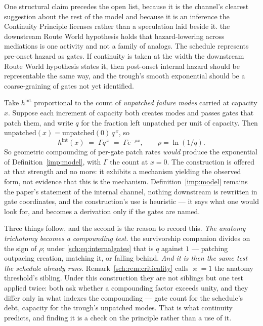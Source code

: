 One structural claim precedes the open list, because it is
the channel's clearest suggestion about the rest of the model and because
it is an inference the Continuity Principle licenses rather than a
speculation laid beside it. the downstream Route World hypothesis holds that hazard-lowering across
mediations is one activity and not a family of analogs. The schedule
represents pre-onset hazard as gates. If continuity is taken at the width
the downstream Route World hypothesis states it, then post-onset internal
hazard should be representable the same way, and the trough's smooth
exponential should be a coarse-graining of gates not yet identified.

\begin{remark}\label{sch:rem:internalgates}
Take $h^{\mathrm{int}}$ proportional to the count of \emph{unpatched
failure modes} carried at capacity $x$. Suppose each increment of
capacity both creates modes and passes gates that patch them, and write
$q$ for the fraction left unpatched per unit of capacity. Then
$\text{unpatched}(x)=\text{unpatched}(0)\,q^{\,x}$, so
\begin{equation}\label{sch:eq:internalgates}
h^{\mathrm{int}}(x)\;=\;\Gamma q^{\,x}\;=\;\Gamma e^{-\rho x},
\qquad \rho=\ln(1/q).
\end{equation}
So geometric compounding of per-gate patch rates \emph{would} produce
the exponential of Definition~\ref{imp:model}, with $\Gamma$ the count at
$x=0$. The construction is offered at that strength and no more: it
exhibits a mechanism yielding the observed form, not evidence that this
is the mechanism. Definition~\ref{imp:model} remains the paper's statement of
the internal channel, nothing downstream is rewritten in gate
coordinates, and the construction's use is heuristic --- it says what one
would look for, and becomes a derivation only if the gates are named.

Three things follow, and the second is the reason to record this. \emph{The anatomy trichotomy becomes a compounding test.}
the survivorship companion \cite{GoldenSurvivorship} divides on the sign of $\rho$;
under \eqref{sch:eq:internalgates} that is $q$ against $1$ --- patching
outpacing creation, matching it, or falling behind. \emph{And it is then the same test the schedule already runs.}
Remark~\ref{sch:rem:criticality} calls $\varkappa=1$ the anatomy threshold's
sibling. Under this construction they are not siblings but one test
applied twice: both ask whether a compounding factor exceeds unity, and
they differ only in what indexes the compounding --- gate count for the
schedule's debt, capacity for the trough's unpatched modes. That is what
continuity predicts, and finding it is a check on the principle rather
than a use of it.


\end{remark}
